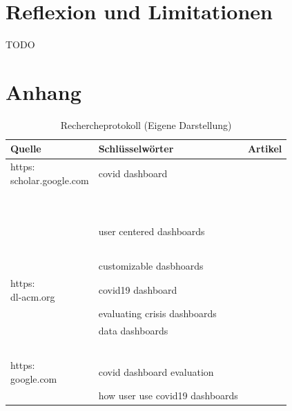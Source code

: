 \documentclass[12pt, oneside]{article}
\begin{document}
\clearpage
\section{Reflexion und Limitationen}
TODO


\clearpage



\clearpage
\section*{Anhang}
\begin{table}[ht]
\begin{tabular}{@{}p{4cm}p{4cm}p{6.5cm}@{}}
\toprule
\textbf{Quelle}                                          & \textbf{Schlüsselwörter}        & \textbf{Artikel} \\ \midrule
\url{https:\\scholar.google.com}                         & covid dashboard                 & ~\citep{Dong.2020}         \\ \midrule
                                                         &                                 & ~\citep{Florez.2020}       \\ \midrule
                                                         &                                 & ~\citep{Berry.2020}        \\ \midrule
                                                         & user centered dashboards        & ~\citep{Francois.2021}     \\ \midrule
                                                         &                                 & ~\citep{Young.2020}        \\ \midrule
                                                         & customizable dasbhoards         & ~\citep{Roberts.2017}      \\ \midrule
\url{https:\\dl-acm.org}                                 & covid19 dashboard               & ~\citep{Vitale.}           \\ \midrule
                                                         & evaluating crisis dashboards    & ~\citep{Ivanov.2018}       \\ \midrule
                                                         & data dashboards                 & ~\citep{Maheshwari.}       \\ \midrule
                                                         &                                 & ~\citep{Beheshti.}         \\ \midrule
\url{https:\\google.com}                                 & covid dashboard evaluation      & ~\citep{Barbazza.}         \\ \midrule
                                                         & how user use covid19 dashboards & ~\citep{Ivankovic.2021}    \\ \bottomrule
\end{tabular}
\caption{\label{tab:research-protocol}Rechercheprotokoll (Eigene Darstellung)}
\end{table}
\clearpage
\end{document}

